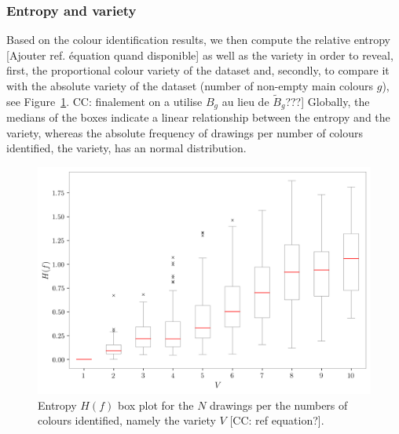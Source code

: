 \documentclass[11pt,a4paper]{article}
\begin{document}
\subsubsection{Entropy and variety}
\label{sec:results_entropy_variety}
Based on the colour identification results, we then compute the relative entropy {\color{red}[Ajouter ref. \'equation quand disponible]} as well as the variety in order to reveal, first, the proportional colour variety of the dataset and, secondly, to compare it with the absolute variety of the dataset (number of non-empty main colours $g$), see Figure~\ref{fig:boxplotvariety}. {\color{red} CC: finalement on a utilise $B_{g}$ au lieu de $\tilde{B}_g$???]}
Globally, the medians of the boxes indicate a linear  relationship between the entropy and the variety, whereas the absolute frequency of drawings per number of colours identified, the variety, has an normal distribution.

\begin{figure}[h!]
	\centering
	\includegraphics[width=\linewidth]{figures/colors-boxplot.png}
	\caption{Entropy $H(f)$ box plot for the $N$ drawings per the numbers of colours identified, namely the variety $V$ {\color{red}[CC: ref equation?]}.}
	\label{fig:boxplotvariety}
\end{figure}
\end{document}
